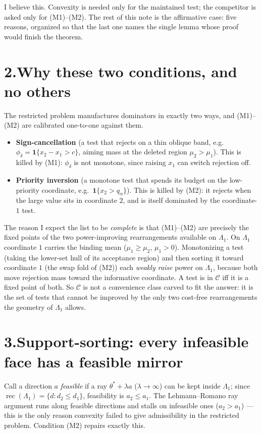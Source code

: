 \documentclass[12pt]{article}
\theoremstyle{definition}
\theoremstyle{remark}
\newcommand{\Lam}{\Lambda}
\newcommand{\Cclass}{\mathcal C}
\DeclareMathOperator{\rec}{rec}
\begin{document}
I believe this. Convexity is needed only for the maintained test; the competitor is asked only for (M1)--(M2). The rest of this note is the affirmative case: five reasons, organized so that the last one names the single lemma whose proof would finish the theorem.

\section*{2.\quad Why these two conditions, and no others}

The restricted problem manufactures dominators in exactly two ways, and (M1)--(M2) are calibrated one-to-one against them.

\begin{itemize}[leftmargin=1.4em]
\item \textbf{Sign-cancellation} (a test that rejects on a thin oblique band, e.g.\ $\phi_\delta=\mathbf 1\{x_2-x_1>c\}$, aiming mass at the deleted region $\mu_2>\mu_1$). This is killed by (M1): $\phi_\delta$ is not monotone, since raising $x_1$ can switch rejection off.
\item \textbf{Priority inversion} (a monotone test that spends its budget on the low-priority coordinate, e.g.\ $\mathbf 1\{x_2>q_\alpha\}$). This is killed by (M2): it rejects when the large value sits in coordinate $2$, and is itself dominated by the coordinate-$1$ test.
\end{itemize}

The reason I expect the list to be \emph{complete} is that (M1)--(M2) are precisely the fixed points of the two power-improving rearrangements available on $\Lam_1$. On $\Lam_1$ coordinate $1$ carries the binding mean ($\mu_1\ge\mu_2$, $\mu_1>0$). Monotonizing a test (taking the lower-set hull of its acceptance region) and then sorting it toward coordinate $1$ (the swap fold of (M2)) each \emph{weakly raise} power on $\Lam_1$, because both move rejection mass toward the informative coordinate. A test is in $\Cclass$ iff it is a fixed point of both. So $\Cclass$ is not a convenience class carved to fit the answer: it is the set of tests that cannot be improved by the only two cost-free rearrangements the geometry of $\Lam_1$ allows.

\section*{3.\quad Support-sorting: every infeasible face has a feasible mirror}

Call a direction $a$ \emph{feasible} if a ray $\theta^*+\lambda a$ ($\lambda\to\infty$) can be kept inside $\Lam_1$; since $\rec(\Lam_1)=\{d:d_2\le d_1\}$, feasibility is $a_2\le a_1$. The Lehmann--Romano ray argument runs along feasible directions and stalls on infeasible ones ($a_2>a_1$) --- this is the only reason convexity failed to give admissibility in the restricted problem. Condition (M2) repairs exactly this.
\end{document}
